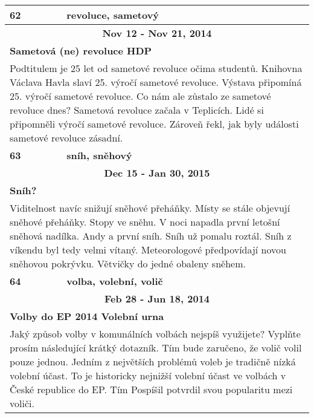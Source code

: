 \begin{tabularx}{\linewidth}{l l}
            \bf 62 & \bf revoluce, sametový \\ \midrule
            
                \multicolumn{2}{c}{\bf Nov 12 - Nov 21, 2014} \\
                \multicolumn{2}{p{\linewidth}}{\bf Sametová (ne) revoluce HDP} \\
                \multicolumn{2}{p{\linewidth}}{Podtitulem je 25 let od sametové revoluce očima studentů. Knihovna Václava Havla slaví 25. výročí sametové revoluce. Výstava připomíná 25. výročí sametové revoluce. Co nám ale zůstalo ze sametové revoluce dnes? Sametová revoluce začala v Teplicích. Lidé si připomněli výročí sametové revoluce. Zároveň řekl, jak byly události sametové revoluce zásadní.} \\ \midrule
                [1.5pt]

            \bf 63 & \bf sníh, sněhový \\ \midrule
            
                \multicolumn{2}{c}{\bf Dec 15 - Jan 30, 2015} \\
                \multicolumn{2}{p{\linewidth}}{\bf Sníh?} \\
                \multicolumn{2}{p{\linewidth}}{Viditelnost navíc snižují sněhové přeháňky. Místy se stále objevují sněhové přeháňky. Stopy ve sněhu. V noci napadla první letošní sněhová nadílka. Andy a první sníh. Sníh už pomalu roztál. Sníh z víkendu byl tedy velmi vítaný. Meteorologové předpovídají novou sněhovou pokrývku. Větvičky do jedné obaleny sněhem.} \\ \midrule
                [1.5pt]

            \bf 64 & \bf volba, volební, volič \\ \midrule
            
                \multicolumn{2}{c}{\bf Feb 28 - Jun 18, 2014} \\
                \multicolumn{2}{p{\linewidth}}{\bf Volby do EP 2014 Volební urna} \\
                \multicolumn{2}{p{\linewidth}}{Jaký způsob volby v komunálních volbách nejspíš využijete? Vyplňte prosím následující krátký dotazník. Tím bude zaručeno, že volič volil pouze jednou. Jedním z největších problémů voleb je tradičně nízká volební účast. To je historicky nejnižší volební účast ve volbách v České republice do EP. Tím Pospíšil potvrdil svou popularitu mezi voliči.} \\ \midrule
                

\end{tabularx}
